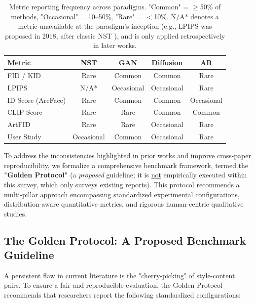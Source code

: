 \documentclass[journal]{IEEEtran}
\begin{document}
\begin{table}[t]
\centering
\caption{Metric reporting frequency across paradigms. "Common" = $\ge$50\% of methods, "Occasional" = 10--50\%, "Rare" = $<$10\%. N/A* denotes a metric unavailable at the paradigm's inception (e.g., LPIPS \cite{zhang2018lpips} was proposed in 2018, after classic NST \cite{gatys2015ana,gatys2016image}), and is only applied retrospectively in later works.}
\label{tab:metric_usage}
\small
\begin{tabular}{lcccc}
\toprule
\textbf{Metric} & \textbf{NST} & \textbf{GAN} & \textbf{Diffusion} & \textbf{AR} \\
\midrule
FID / KID        & Rare & Common & Common & Rare \\
LPIPS            & N/A*   & Occasional & Occasional & Rare \\
ID Score (ArcFace) & Rare & Common & Common & Occasional \\
CLIP Score       & Rare & Rare & Common & Common \\
ArtFID           & Rare & Rare & Occasional & Rare \\
User Study       & Occasional & Common & Occasional & Rare \\
\bottomrule
\end{tabular}
\end{table}

To address the inconsistencies highlighted in prior works and improve cross-paper reproducibility, we formalize a comprehensive benchmark framework, termed the \textbf{"Golden Protocol"} (a \textit{proposed} guideline; it is \underline{not} empirically executed within this survey, which only surveys existing reports). This protocol recommends a multi-pillar approach encompassing standardized experimental configurations, distribution-aware quantitative metrics, and rigorous human-centric qualitative studies.

\subsection{The Golden Protocol: A Proposed Benchmark Guideline}
\label{sec:benchmark}
\label{sec:evaluation:configuration}

A persistent flaw in current literature is the "cherry-picking" of style-content pairs. To ensure a fair and reproducible evaluation, the Golden Protocol recommends that researchers report the following standardized configurations:
\end{document}
